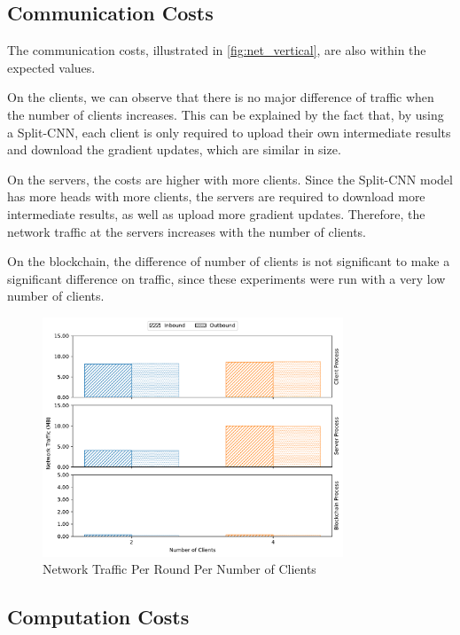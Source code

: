 \subsection{Communication Costs}

The communication costs, illustrated in \autoref{fig:net_vertical}, are also within the expected values.

On the clients, we can observe that there is no major difference of traffic when the number of clients increases. This can be explained by the fact that, by using a Split-CNN, each client is only required to upload their own intermediate results and download the gradient updates, which are similar in size.

On the servers, the costs are higher with more clients. Since the Split-CNN model has more heads with more clients, the servers are required to download more intermediate results, as well as upload more gradient updates. Therefore, the network traffic at the servers increases with the number of clients.

On the blockchain, the difference of number of clients is not significant to make a significant difference on traffic, since these experiments were run with a very low number of clients.

\begin{figure}[!ht]
    \centering
    \centering
    \includegraphics[width=0.8\textwidth]{graphics/vertical/net.pdf}
    \caption{Network Traffic Per Round Per Number of Clients}
    \label{fig:net_vertical}
\end{figure}

\subsection{Computation Costs}

